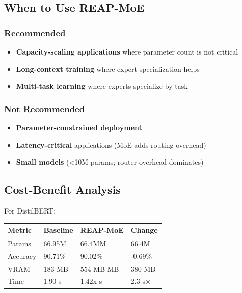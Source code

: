 \subsection{When to Use REAP-MoE}

\subsubsection{Recommended}
\begin{itemize}
\item \textbf{Capacity-scaling applications} where parameter count is not critical
\item \textbf{Long-context training} where expert specialization helps
\item \textbf{Multi-task learning} where experts specialize by task

\end{itemize}
\subsubsection{Not Recommended}
\begin{itemize}
\item \textbf{Parameter-constrained deployment}
\item \textbf{Latency-critical} applications (MoE adds routing overhead)
\item \textbf{Small models} (\textless{}10M params; router overhead dominates)

\end{itemize}
\subsection{Cost-Benefit Analysis}

For DistilBERT:

\begin{table}[H]
\centering
\small
\begin{tabular}{llll}
\toprule
\textbf{Metric} & \textbf{Baseline} & \textbf{REAP-MoE} & \textbf{Change} \\
\midrule
Params & 66.95M & 66.4MM & 66.4M \\
Accuracy & 90.71\% & 90.02\% & -0.69\% \\
VRAM & 183 MB & 554 MB MB & 380 MB \\
Time & 1.90 s & 1.42x s & 2.3 s$\times$ \\
\bottomrule
\end{tabular}
\end{table}

